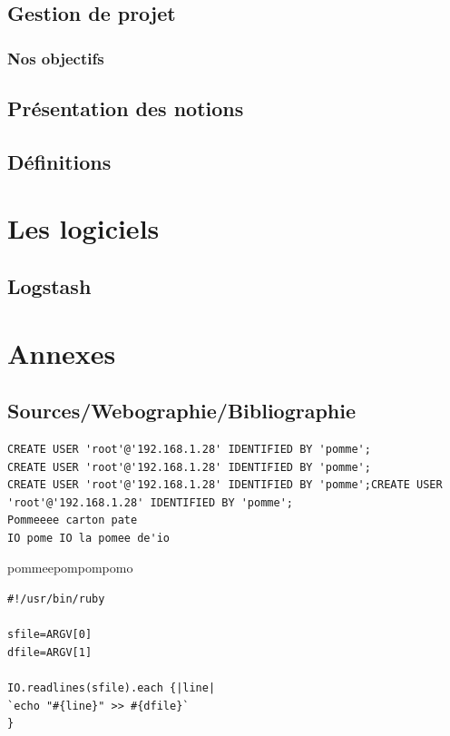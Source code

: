 \documentclass[a4paper,12pt,one side,titlepage]{report}
\begin{document}
\chapter{Gestion de projet}
\lipsum
%
\section{Nos objectifs}
\lipsum
\chapter{Présentation des notions}
\chapter{Définitions}

\part{Les logiciels}
\chapter{Logstash}



\part{Annexes}
\chapter{Sources/Webographie/Bibliographie}



\begin{lstlisting}[style=code]
CREATE USER 'root'@'192.168.1.28' IDENTIFIED BY 'pomme';
CREATE USER 'root'@'192.168.1.28' IDENTIFIED BY 'pomme';
CREATE USER 'root'@'192.168.1.28' IDENTIFIED BY 'pomme';CREATE USER 'root'@'192.168.1.28' IDENTIFIED BY 'pomme';
Pommeeee carton pate
IO pome IO la pomee de'io
\end{lstlisting}

pommeepompompomo

\begin{lstlisting}[style=code]
#!/usr/bin/ruby

sfile=ARGV[0]
dfile=ARGV[1]

IO.readlines(sfile).each {|line|
`echo "#{line}" >> #{dfile}`
}
\end{lstlisting}

\printglossaries
\end{document}
